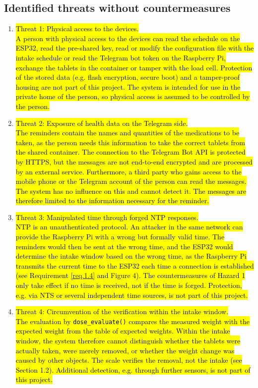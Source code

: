 \subsection{Identified threats without countermeasures}
\begin{enumerate}
  \item \hl{Threat 1: Physical access to the devices.}\\
  \hl{A person with physical access to the devices can read the schedule on
  the ESP32, read the pre-shared key, read or modify the configuration file with the
  intake schedule or read the Telegram bot token on the Raspberry Pi, exchange the tablets
  in the container or tamper with the load cell. Protection of the stored data
  (e.g. flash encryption, secure boot) and a tamper-proof housing are not part of
  this project. The system is intended for use in the private home of the
  person, so physical access is assumed to be controlled by the person.}

  \item \hl{Threat 2: Exposure of health data on the Telegram side.}\\
  \hl{The reminders contain the names and quantities of the medications to be
  taken, as the person needs this information to take the correct tablets from
  the shared container. The connection to the Telegram Bot API is
  protected by HTTPS, but the messages are not end-to-end encrypted and are
  processed by an external service. Furthermore, a third party who gains
  access to the mobile phone or the Telegram account of the person can read the
  messages. The system has no influence on this and cannot detect it. The
  messages are therefore limited to the information necessary for the
  reminder.}

  \item \hl{Threat 3: Manipulated time through forged NTP responses.}\\
  \hl{NTP is an unauthenticated protocol. An attacker in the same network can
  provide the Raspberry Pi with a wrong but formally valid time. The reminders
  would then be sent at the wrong time, and the ESP32 would determine the
  intake window based on the wrong time, as the Raspberry Pi transmits the
  current time to the ESP32 each time a connection is established (see
  Requirement \ref{req.1.4} and Figure 4). The countermeasures of Hazard 1 only take effect
  if no time is received, not if the time is forged. Protection, e.g. via NTS
  or several independent time sources, is not part of this project.}

  \item \hl{Threat 4: Circumvention of the verification within the intake window.}\\
  \hl{The evaluation by {\texttt{dose\_evaluate()}} compares the measured weight with
  the expected weight from the table of expected weights. Within the intake window, the system therefore cannot
  distinguish whether the tablets were actually taken, were merely removed, or
  whether the weight change was caused by other objects. The scale verifies the
  removal, not the intake (see Section 1.2). Additional detection, e.g. through
  further sensors, is not part of this project.}
\end{enumerate}